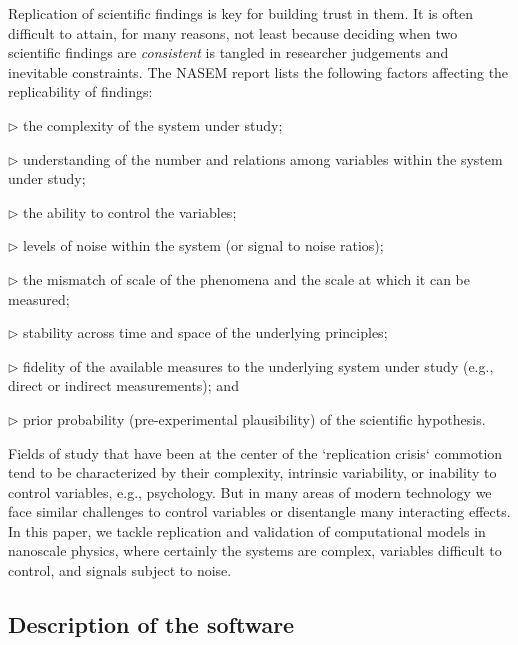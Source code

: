 Replication of scientific findings is key for building trust in them. 
It is often difficult to attain, for many reasons, not least because deciding when two scientific findings are \emph{consistent} is tangled in researcher judgements and inevitable constraints. 
The NASEM report lists the following factors affecting the replicability of findings: 

\begin{compactitem}

\item[$\triangleright$] the complexity of the system under study;
\item[$\triangleright$] understanding of the number and relations among variables within the system under study;
\item[$\triangleright$] the ability to control the variables; 
\item[$\triangleright$] levels of noise within the system (or signal to noise ratios);
\item[$\triangleright$] the mismatch of scale of the phenomena and the scale at which it can be measured; 
\item[$\triangleright$] stability across time and space of the underlying principles; 
\item[$\triangleright$] fidelity of the available measures to the underlying system under study (e.g., direct  or indirect measurements); and
\item[$\triangleright$] prior probability (pre-experimental plausibility) of the scientific hypothesis.

\end{compactitem}

\noindent
Fields of study that have been at the center of the `replication crisis` commotion tend to be characterized by their complexity, intrinsic variability, or inability to control variables, e.g., psychology. 
But in many areas of modern technology we face similar challenges to control variables or disentangle many interacting effects. 
In this paper, we tackle replication and validation of computational models in nanoscale physics, where certainly the systems are complex, variables difficult to control, and signals subject to noise.

\subsection{Description of the \pygbe software}

